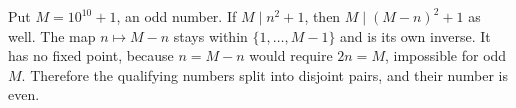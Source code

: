 Put $M=10^{10}+1$, an odd number. If $M\mid n^2+1$, then $M\mid(M-n)^2+1$ as well. The map $n\mapsto M-n$ stays within $\{1,\ldots,M-1\}$ and is its own inverse. It has no fixed point, because $n=M-n$ would require $2n=M$, impossible for odd $M$. Therefore the qualifying numbers split into disjoint pairs, and their number is even.
